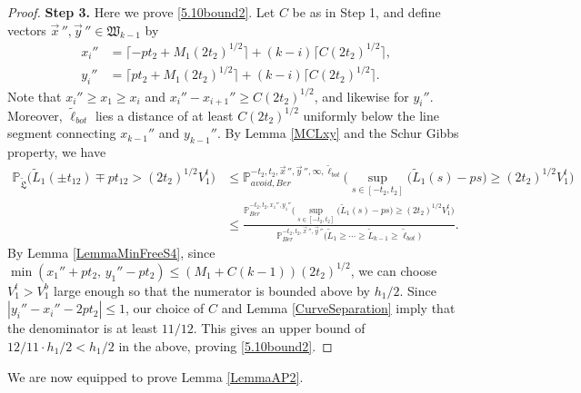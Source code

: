 \begin{proof}
	\noindent\textbf{Step 3.} Here we prove \eqref{5.10bound2}. Let $C$ be as in Step 1, and define vectors $\vec{x}\,'', \vec{y}\,''\in\mathfrak{W}_{k-1}$ by
	\begin{align*}
	x_i'' &= \lceil -pt_2 + M_1(2t_2)^{1/2}\rceil + (k-i)\lceil C(2t_2)^{1/2}\rceil,\\
	y_i'' &= \lceil pt_2 + M_1(2t_2)^{1/2}\rceil + (k-i)\lceil C(2t_2)^{1/2}\rceil.
	\end{align*}
	Note that $x_i'' \geq x_1 \geq x_i$ and $x_i''-x_{i+1}'' \geq C(2t_2)^{1/2}$, and likewise for $y_i''$. Moreover, $\tilde{\ell}_{bot}$ lies a distance of at least $C(2t_2)^{1/2}$ uniformly below the line segment connecting $x_{k-1}''$ and $y_{k-1}''$. By Lemma \ref{MCLxy} and the Schur Gibbs property, we have
	\begin{align*}
	\mathbb{P}_{\tilde{\mathfrak{L}}}\Big(\tilde{L}_1(\pm t_{12}) \mp pt_{12} > (2t_2)^{1/2}V_1^t\Big) &\leq \mathbb{P}^{-t_2,t_2,\vec{x}\,'',\vec{y}\,'',\infty,\tilde{\ell}_{bot}}_{avoid,Ber}\Big(\sup_{s\in[-t_2,t_2]} \big(\tilde{L}_1(s)-ps\big) \geq (2t_2)^{1/2}V_1^t\Big)\\
	&\leq \frac{\mathbb{P}^{-t_2,t_2,x_1'',y_1''}_{Ber}\Big(\sup_{s\in[-t_2,t_2]} \big(\tilde{L}_1(s)-ps\big) \geq (2t_2)^{1/2}V_1^t\Big)}{\mathbb{P}^{-t_2,t_2,\vec{x}\,'',\vec{y}\,''}_{Ber}\big(\tilde{L}_1\geq\cdots\geq\tilde{L}_{k-1}\geq\tilde{\ell}_{bot}\big)}.
	\end{align*}
	By Lemma \ref{LemmaMinFreeS4}, since $\min(x_1'' + pt_2, \, y_1'' - pt_2) \leq (M_1+C(k-1))(2t_2)^{1/2}$, we can choose $V_1^t > V_1^b$ large enough so that the numerator is bounded above by $h_1/2$. Since $|y_i'' - x_i'' - 2pt_2| \leq 1$, our choice of $C$ and Lemma \ref{CurveSeparation} imply that the denominator is at least $11/12$. This gives an upper bound of $12/11\cdot h_1/2 < h_1/2$ in the above, proving \eqref{5.10bound2}.
	
	
\end{proof}

We are now equipped to prove Lemma \ref{LemmaAP2}.

